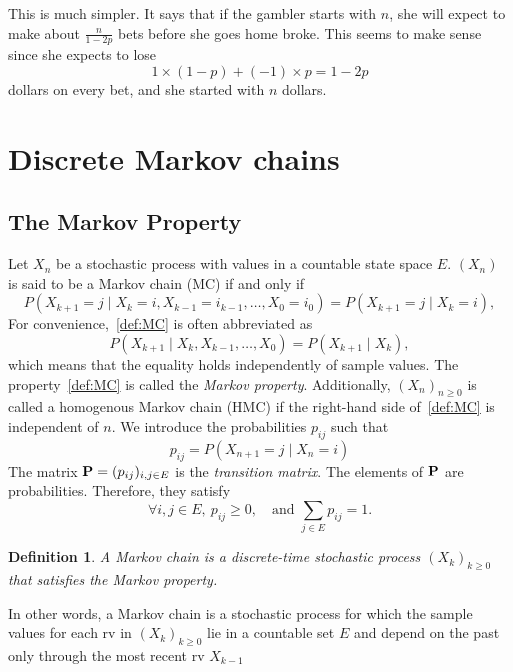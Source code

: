 \documentclass[12pt,a4paper]{article}
\newtheorem{definition}{Definition}
\newcommand{\bP}{\bold P}
\begin{document}
	This is much simpler. It says that if the gambler starts with \( n \), she will expect to make about \( \frac{n}{1 - 2p} \) bets before she goes home broke. This seems to make sense since she expects to lose
	\[
	1 \times (1 - p) + (-1)\times p = 1 - 2p
	\]
	dollars on every bet, and she started with \( n \) dollars.
	
	
	
	
	
\newpage
\section{Discrete Markov chains}
\subsection{The Markov Property}
Let $X_n$ be a stochastic process with values in a countable state space $E$. $(X_n)$ is said to be a Markov chain (MC) if and only if
\begin{equation}\label{def:MC}
P(X_{k+1} = j \mid X_k = i, X_{k-1} = i_{k-1}, \dots, X_0 = i_0) = P(X_{k+1} = j \mid X_k = i),
\end{equation}
For convenience,~\eqref{def:MC} is often abbreviated as 
\begin{equation}\label{def:MC}
	P(X_{k+1} \mid X_k, X_{k-1} , \dots, X_0) = P(X_{k+1} \mid X_k),
\end{equation}
which means that the equality holds independently of sample values.
The property~\eqref{def:MC} is called the \textit{Markov property}.
Additionally, $(X_n)_{n\geq 0}$ is called a homogenous Markov chain (HMC) if the right-hand side of~\eqref{def:MC} is independent of $n$.
We introduce the probabilities $p_{ij}$ such that
\begin{equation}
	p_{ij} =  P(X_{n+1} = j \mid X_n = i)
\end{equation}
The matrix $\bold P = (p_{ij})_{i,j\in E}$ is the \textit{transition matrix}.
The elements of $\bP$ are probabilities. Therefore, they satisfy
\begin{equation}
	 \forall i,j\in E, \ p_{ij}\geq 0,\quad \text{and } \sum_{j \in E} p_{ij} = 1.
\end{equation}
\begin{definition}
	A \textit{Markov chain} is a discrete-time stochastic process $(X_k)_{k\geq 0}$ that satisfies the Markov property.
	\end{definition}
	In other words, a Markov chain is a stochastic process for which the sample values for each rv in $(X_k)_{k\geq 0}$ lie in a countable set $E$ and depend on the past only through the most recent rv $X_{k-1}$
	
\end{document}
